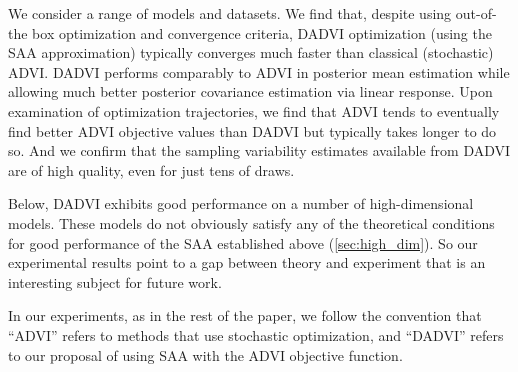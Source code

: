 We consider a range of models and datasets. We find that, despite using
out-of-the box optimization and convergence criteria, DADVI optimization (using
the SAA approximation) typically converges much faster than classical
(stochastic) ADVI. DADVI performs comparably to ADVI in posterior mean
estimation while allowing much better posterior covariance estimation via linear
response. Upon examination of optimization trajectories, we find that ADVI tends
to eventually find better ADVI objective values than DADVI but typically takes
longer to do so. And we confirm that the sampling variability estimates
available from DADVI are of high quality, even for just tens of draws.

Below, DADVI exhibits good performance on a number of high-dimensional models.
These models do not obviously satisfy any of the theoretical conditions for good
performance of the SAA established above (\cref{sec:high_dim}).  So our
experimental results point to a gap between theory and experiment that is an
interesting subject for future work.

In our experiments, as in the rest of the paper, we follow the convention that
``ADVI'' refers to methods that use stochastic optimization, and ``DADVI''
refers to our proposal of using SAA with the ADVI objective function.